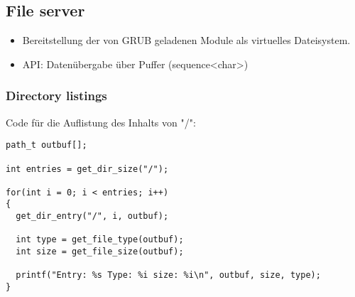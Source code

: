 \subsection{File server}





\begin{itemize}
	\item Bereitstellung der von GRUB geladenen Module als virtuelles Dateisystem.
	
	\item API: Datenübergabe über Puffer (sequence<char>)
\end{itemize}

\subsubsection{Directory listings}

Code für die Auflistung des Inhalts von "/":

\begin{lstlisting}
path_t outbuf[];

int entries = get_dir_size("/");

for(int i = 0; i < entries; i++)
{
  get_dir_entry("/", i, outbuf);
  
  int type = get_file_type(outbuf);
  int size = get_file_size(outbuf);
  
  printf("Entry: %s Type: %i size: %i\n", outbuf, size, type);
}
\end{lstlisting}

